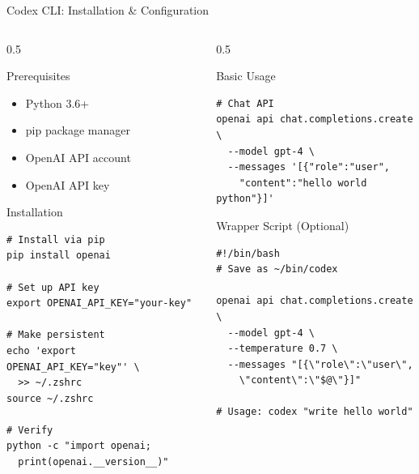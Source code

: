 \documentclass[aspectratio=169,11pt]{beamer}
\begin{document}
\begin{frame}[fragile]{Codex CLI: Installation \& Configuration}
    \begin{columns}[T]
        \begin{column}{0.5\textwidth}
            \begin{block}{Prerequisites}
                \begin{itemize}
                    \item Python 3.6+
                    \item pip package manager
                    \item OpenAI API account
                    \item OpenAI API key
                \end{itemize}
            \end{block}

            \begin{block}{Installation}
                \begin{lstlisting}[style=bash]
# Install via pip
pip install openai

# Set up API key
export OPENAI_API_KEY="your-key"

# Make persistent
echo 'export OPENAI_API_KEY="key"' \
  >> ~/.zshrc
source ~/.zshrc

# Verify
python -c "import openai;
  print(openai.__version__)"
                \end{lstlisting}
            \end{block}
        \end{column}
        \begin{column}{0.5\textwidth}
            \begin{block}{Basic Usage}
                \begin{lstlisting}[style=bash]
# Chat API
openai api chat.completions.create \
  --model gpt-4 \
  --messages '[{"role":"user",
    "content":"hello world python"}]'
                \end{lstlisting}
            \end{block}

            \begin{block}{Wrapper Script (Optional)}
                \begin{lstlisting}[style=bash]
#!/bin/bash
# Save as ~/bin/codex

openai api chat.completions.create \
  --model gpt-4 \
  --temperature 0.7 \
  --messages "[{\"role\":\"user\",
    \"content\":\"$@\"}]"

# Usage: codex "write hello world"
                \end{lstlisting}
            \end{block}
        \end{column}
    \end{columns}

\end{frame}
\end{document}
